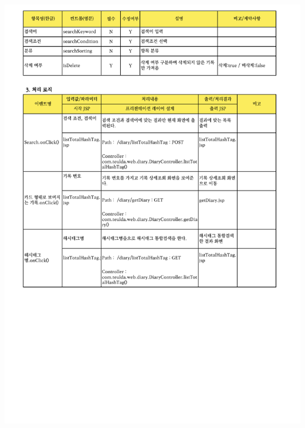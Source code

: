 {{{{{{{{{{{{{{{{{{{{{{{{{{{{{{{{{{{{{{{{{{{{{{{{{{{{{{{{{{{{{{{{{{{{{{{{{{{{{{{{{{{{{\includegraphics[width=20cm]{./Figure/Design/Display/totalSearch/totalSearch_08.pdf} \\
}}}}}}}}}}}}}}}}}}}}}}}}}}}}}}}}}}}}}}}}}}}}}}}}}}}}}}}}}}}}}}}}}}}}}}}}}}}}}}}}}}}}}
